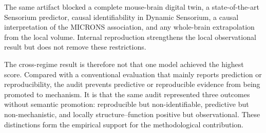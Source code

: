 The same artifact blocked a complete mouse-brain digital twin, a
state-of-the-art Sensorium predictor, causal identifiability in Dynamic
Sensorium, a causal interpretation of the MICRONS association, and any
whole-brain extrapolation from the local volume. Internal reproduction strengthens the
local observational result but does not remove these restrictions.

The cross-regime result is therefore not that one model achieved the highest
score. Compared with a conventional evaluation that mainly reports prediction or reproducibility, the audit prevents predictive or reproducible evidence from being promoted to mechanism. It is that the same audit represented three outcomes without semantic
promotion: reproducible but non-identifiable, predictive but non-mechanistic,
and locally structure--function positive but observational. These distinctions
form the empirical support for the methodological contribution.

